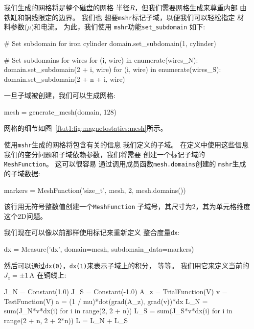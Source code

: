 我们生成的网格将是整个磁盘的网格
半径$R$，但我们需要网格生成来尊重内部
由铁缸和铜线限定的边界。 我们也
想要\texttt{mshr}标记子域，以便我们可以轻松指定
材料参数($\mu$)和电流。 为此，我们使用
\texttt{mshr}功能\verb!set_subdomain! 如下:

\begin{python}
# Set subdomain for iron cylinder
domain.set_subdomain(1, cylinder)

# Set subdomains for wires
for (i, wire) in enumerate(wires_N):
    domain.set_subdomain(2 + i, wire)
for (i, wire) in enumerate(wires_S):
    domain.set_subdomain(2 + n + i, wire)
\end{python}
一旦子域被创建，我们可以生成网格:

\begin{python}
mesh = generate_mesh(domain, 128)
\end{python}
网格的细节如图~\ref{ftut1:fig:magnetostatics:mesh}所示。


使用\texttt{mshr}生成的网格将包含有关的信息
我们定义的子域。 在定义中使用这些信息
我们的变分问题和子域依赖参数，我们将需要
创建一个标记子域的\texttt{MeshFunction}。 这可以很容易
通过调用成员函数\texttt{mesh.domains}创建的
\texttt{mshr}生成的子域数据:

\begin{python}
markers = MeshFunction('size_t', mesh, 2, mesh.domains())
\end{python}
该行用无符号整数值创建一个\texttt{MeshFunction}
子域号，其尺寸为2，其为单元格维度
这个2D问题。

我们现在可以像以前那样使用标记来重新定义
整合度量\texttt{dx}:


\begin{python}
dx = Measure('dx', domain=mesh, subdomain_data=markers)
\end{python}
然后可以通过\texttt{dx(0)}，\texttt{dx(1)}来表示子域上的积分，
等等。 我们用它来定义当前的$J_z = \pm 1\,\mathrm{A}$
在铜线上:

\begin{python}
J_N = Constant(1.0)
J_S = Constant(-1.0)
A_z = TrialFunction(V)
v = TestFunction(V)
a = (1 / mu)*dot(grad(A_z), grad(v))*dx
L_N = sum(J_N*v*dx(i) for i in range(2, 2 + n))
L_S = sum(J_S*v*dx(i) for i in range(2 + n, 2 + 2*n))
L = L_N + L_S
\end{python}

